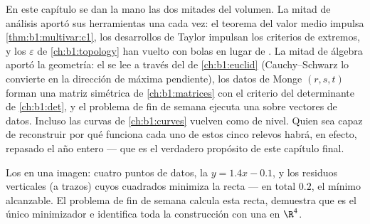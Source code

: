 \begin{remark}
\label{rem:b1:multivar:perspectives}
En este capítulo se dan la mano las dos mitades del volumen. La
mitad de análisis aportó sus herramientas una  cada vez: el
teorema del valor medio impulsa \cref{thm:b1:multivar:c1}, los desarrollos
de Taylor impulsan los criterios de extremos, y los $\varepsilon$ de
\cref{ch:b1:topology} han vuelto con bolas en lugar de
. La mitad de álgebra aportó la geometría: el 
se lee a través del  de \cref{ch:b1:euclid}
(Cauchy--Schwarz lo convierte en la dirección de máxima pendiente), los datos
de Monge $(r, s, t)$ forman una matriz simétrica de
\cref{ch:b1:matrices} con el criterio del determinante de
\cref{ch:b1:det}, y el problema de fin de semana ejecuta una  sobre vectores de datos. Incluso las curvas de
\cref{ch:b1:curves} vuelven como  de nivel. Quien sea capaz de
reconstruir por qué funciona cada uno de estos cinco relevos habrá,
en efecto, repasado el año entero --- que es el verdadero propósito
de este capítulo final.
\end{remark}

\begin{omfigure}

{\small Los  en una imagen: cuatro puntos de datos, la
 $y = 1.4x - 0.1$, y los residuos verticales
(a trazos) cuyos cuadrados minimiza la recta --- en total $0.2$, el
mínimo alcanzable. El problema de fin de semana calcula esta recta,
demuestra que es el único minimizador e identifica toda la
construcción con una  en $\R^4$.}
\end{omfigure}

